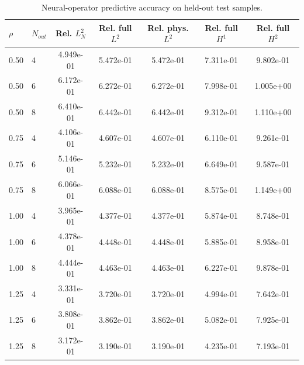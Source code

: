 \begin{table}[h]
\centering
\small
\begin{tabular}{llccccc}
\toprule
$\rho$ & $N_{out}$ & Rel. $L^2_N$ & Rel. full $L^2$ & Rel. phys. $L^2$ & Rel. full $H^{1}$ & Rel. full $H^{2}$ \\
\midrule
0.50 & 4 & 4.949e-01 & 5.472e-01 & 5.472e-01 & 7.311e-01 & 9.802e-01 \\
0.50 & 6 & 6.172e-01 & 6.272e-01 & 6.272e-01 & 7.998e-01 & 1.005e+00 \\
0.50 & 8 & 6.410e-01 & 6.442e-01 & 6.442e-01 & 9.312e-01 & 1.110e+00 \\
0.75 & 4 & 4.106e-01 & 4.607e-01 & 4.607e-01 & 6.110e-01 & 9.261e-01 \\
0.75 & 6 & 5.146e-01 & 5.232e-01 & 5.232e-01 & 6.649e-01 & 9.587e-01 \\
0.75 & 8 & 6.066e-01 & 6.088e-01 & 6.088e-01 & 8.575e-01 & 1.149e+00 \\
1.00 & 4 & 3.965e-01 & 4.377e-01 & 4.377e-01 & 5.874e-01 & 8.748e-01 \\
1.00 & 6 & 4.378e-01 & 4.448e-01 & 4.448e-01 & 5.885e-01 & 8.958e-01 \\
1.00 & 8 & 4.444e-01 & 4.463e-01 & 4.463e-01 & 6.227e-01 & 9.878e-01 \\
1.25 & 4 & 3.331e-01 & 3.720e-01 & 3.720e-01 & 4.994e-01 & 7.642e-01 \\
1.25 & 6 & 3.808e-01 & 3.862e-01 & 3.862e-01 & 5.082e-01 & 7.925e-01 \\
1.25 & 8 & 3.172e-01 & 3.190e-01 & 3.190e-01 & 4.235e-01 & 7.193e-01 \\
\bottomrule
\end{tabular}
\caption{Neural-operator predictive accuracy on held-out test samples.}
\label{tab:operator_accuracy_poisson}
\end{table}
